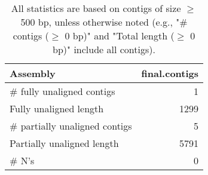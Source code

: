 \documentclass[12pt,a4paper]{article}
\begin{document}
\begin{table}[ht]
\begin{center}
\caption{All statistics are based on contigs of size $\geq$ 500 bp, unless otherwise noted (e.g., "\# contigs ($\geq$ 0 bp)" and "Total length ($\geq$ 0 bp)" include all contigs).}
\begin{tabular}{|l*{1}{|r}|}
\hline
Assembly & final.contigs \\ \hline
\# fully unaligned contigs & 1 \\ \hline
Fully unaligned length & 1299 \\ \hline
\# partially unaligned contigs & 5 \\ \hline
Partially unaligned length & 5791 \\ \hline
\# N's & 0 \\ \hline
\end{tabular}
\end{center}
\end{table}
\end{document}
